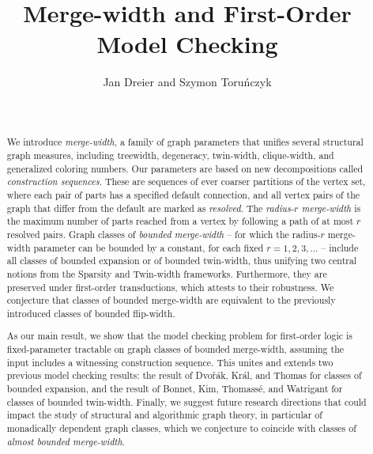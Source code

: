 \documentclass[11pt]{article}
\theoremstyle{remark}
\def\Dvorak{Dvo\v{r}\'{a}k\xspace}
\def\Kral{Kr\'{a}l\xspace}
\newcommand{\anonym}[2][]{#2}%
\begin{document}
\title{\vspace{-1.5em}Merge-width and First-Order Model Checking}
%

\author{{Jan Dreier and Szymon Toru\'nczyk}}

  \date{~}
\maketitle

\vspace{-4em}
\begin{abstract}
We introduce \emph{merge-width}, a family of graph parameters that unifies several structural graph measures, including treewidth, degeneracy, twin-width, clique-width, and generalized coloring numbers.
Our parameters are based on new decompositions called \emph{construction sequences}.
These are sequences of ever coarser partitions of the vertex set, where each pair of parts has a specified default connection, and all  vertex pairs of the graph that differ from the default are marked as \emph{resolved}.
 The \emph{radius-$r$ merge-width} is the maximum number of parts reached from a vertex by following a path of at most $r$ resolved pairs.
 Graph classes of \emph{bounded merge-width}
 -- for which the radius-\(r\) merge-width parameter can be bounded by a constant, for each fixed \(r=1,2,3,\ldots\) --  include all classes of bounded expansion or of bounded twin-width, thus unifying two central notions from the Sparsity and Twin-width frameworks. Furthermore, they are preserved under first-order transductions, which attests to their robustness.
We conjecture that classes of bounded merge-width are equivalent to the previously introduced classes of bounded flip-width.

As our main result, we show that the model checking problem for first-order logic is fixed-parameter tractable on graph classes of bounded merge-width, assuming the input includes a witnessing construction sequence. This unites and extends two previous model checking results: the result of \Dvorak, \Kral, and Thomas for classes of bounded expansion, and the result of Bonnet, Kim, Thomass\'e, and Watrigant for classes of bounded twin-width.
 Finally, we suggest future research directions that could impact the study of structural and algorithmic graph theory, in particular of monadically dependent graph classes, which we conjecture to coincide with classes of \emph{almost bounded merge-width}.
\end{abstract}
\end{document}
